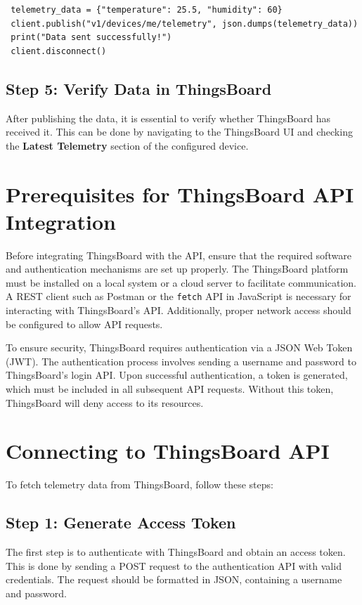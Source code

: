 \documentclass[a4paper,12pt]{report}
\begin{document}
 \begin{lstlisting}
 telemetry_data = {"temperature": 25.5, "humidity": 60}
 client.publish("v1/devices/me/telemetry", json.dumps(telemetry_data))
 print("Data sent successfully!")
 client.disconnect()
 \end{lstlisting}
 
 \subsection{Step 5: Verify Data in ThingsBoard}
 After publishing the data, it is essential to verify whether ThingsBoard has received it. This can be done by navigating to the ThingsBoard UI and checking the \textbf{Latest Telemetry} section of the configured device.

 \section{Prerequisites for ThingsBoard API Integration}
 
 Before integrating ThingsBoard with the API, ensure that the required software and authentication mechanisms are set up properly. The ThingsBoard platform must be installed on a local system or a cloud server to facilitate communication. A REST client such as Postman or the \texttt{fetch} API in JavaScript is necessary for interacting with ThingsBoard’s API. Additionally, proper network access should be configured to allow API requests.
 
 To ensure security, ThingsBoard requires authentication via a JSON Web Token (JWT). The authentication process involves sending a username and password to ThingsBoard’s login API. Upon successful authentication, a token is generated, which must be included in all subsequent API requests. Without this token, ThingsBoard will deny access to its resources.
 
 \section{Connecting to ThingsBoard API}
 
 To fetch telemetry data from ThingsBoard, follow these steps:
 
 \subsection{Step 1: Generate Access Token}
 The first step is to authenticate with ThingsBoard and obtain an access token. This is done by sending a POST request to the authentication API with valid credentials. The request should be formatted in JSON, containing a username and password.
 
\end{document}
